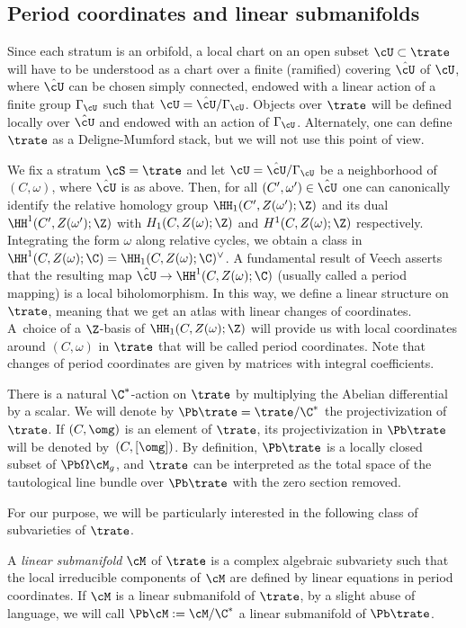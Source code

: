 \subsection{Period coordinates and linear submanifolds}\label{sec:local:coord}
Since each stratum is an orbifold, a local chart on an open subset $\cU\subset\trate$ will have to be understood as a chart over a finite (ramified) covering $\hat\cU$ of $\cU$, where $\hat\cU$ can be chosen simply connected, endowed with a linear action of a finite group $\Gamma_\cU$ such that $\cU=\hat\cU/\Gamma_\cU$. Objects over $\trate$ will be defined locally over $\hat\cU$ and endowed with an action of $\Gamma_\cU$. Alternately, one can define $\trate$ as a Deligne-Mumford stack, but we will not use this point of view.

We fix a stratum $\cS=\trate$ and let $\cU=\hat\cU/\Gamma_\cU$ be a neighborhood of $(C,\omega)$, where $\hat\cU$ is as above. Then, for all $(C',\omega')\in\hat\cU$ one can canonically identify the relative homology group $\HH_1(C', Z(\omega'); \Z)$ and its dual $\HH^1(C', Z(\omega'); \Z)$ with $H_1(C,Z(\omega);\Z)$ and $H^1(C,Z(\omega);\Z)$ respectively.
Integrating the form $\omega$ along relative cycles, we obtain a class in $\HH^1(C,Z(\omega); \C)=\HH_{1}(C,Z(\omega); \C)^\vee$. A fundamental result of Veech \cite{Veech90} asserts that the resulting map $\hat\cU\to \HH^1 (C, Z(\omega); \C)$
(usually called a period mapping) is a local biholomorphism. In this way, we define a linear structure on $\trate$, meaning that we get an atlas with linear changes of coordinates. A~choice of a $\Z$-basis of $\HH_1 (C, Z(\omega); \Z)$ will provide us with local coordinates around $(C, \omega)$ in $\trate$ that will be called period coordinates. Note that changes of period coordinates are given by matrices with integral coefficients.

There is a natural $\C^*$-action on $\trate$ by multiplying the Abelian differential by a scalar.
We will denote by $\Pb\trate=\trate/\C^*$ the projectivization of $\trate$.
If $(C,\omg)$ is an element of $\trate$, its projectivization in $\Pb\trate$ will be denoted by~$(C,[\omg])$.
By definition, $\Pb\trate$ is a locally closed subset of $\Pb\Omega\cM_g$, and $\trate$ can be interpreted as the total space of the tautological line bundle over $\Pb\trate$ with the zero section removed.

For our purpose, we will be particularly interested in the following class of subvarieties of $\trate$.

\begin{Definition}\label{def:lin:man}
A \emph{linear submanifold} $\cM$ of $\trate$ is a complex algebraic subvariety such that the local irreducible components of $\cM$ are defined by linear equations in period coordinates.
If $\cM$ is a linear submanifold of $\trate$, by a slight abuse of language, we will call $\Pb\cM:=\cM/\C^*$ a linear submanifold of $\Pb\trate$.
\end{Definition}

